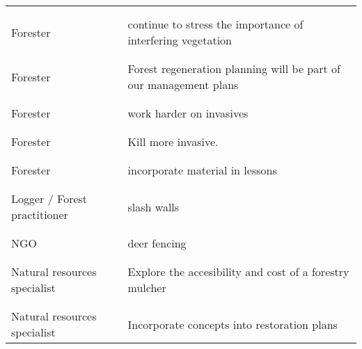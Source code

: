 \documentclass[
]{article}
\begin{document}
\begin{longtable}[t]{l>{\raggedright\arraybackslash}p{10cm}}
\midrule\\
\cellcolor{gray!10}{Forester} & \cellcolor{gray!10}{Invasive plants control}\\
\midrule
Forester & continue to stress the importance of interfering vegetation\\
\midrule\\
\addlinespace
\cellcolor{gray!10}{Forester} & \cellcolor{gray!10}{I am now retired, so probably no specific actions}\\
\midrule
Forester & Forest regeneration planning will be part of our management plans\\
\midrule\\
\cellcolor{gray!10}{Forester} & \cellcolor{gray!10}{I would like to try a Fecon mower.}\\
\midrule
Forester & work harder on invasives\\
\midrule\\
\cellcolor{gray!10}{Forester} & \cellcolor{gray!10}{Integrate what I learn from the webinar when dealing with private property.}\\
\midrule
\addlinespace
Forester & Kill more invasive.\\
\midrule\\
\cellcolor{gray!10}{Forester} & \cellcolor{gray!10}{Promote slash fences.}\\
\midrule
Forester & incorporate material in lessons\\
\midrule\\
\cellcolor{gray!10}{Forester} & \cellcolor{gray!10}{herbaceous and woody plant control with propane torch}\\
\midrule
Logger / Forest practitioner & slash walls\\
\midrule\\
\addlinespace
\cellcolor{gray!10}{Logger / Forest practitioner} & \cellcolor{gray!10}{Slash wall}\\
\midrule
NGO & deer fencing\\
\midrule\\
\cellcolor{gray!10}{Natural resources specialist} & \cellcolor{gray!10}{Some of techniques will help in my restoration projects}\\
\midrule
Natural resources specialist & Explore the accesibility and cost of a forestry mulcher\\
\midrule\\
\cellcolor{gray!10}{Natural resources specialist} & \cellcolor{gray!10}{N/A}\\
\midrule
\addlinespace
Natural resources specialist & Incorporate concepts into restoration plans\\

\end{longtable}
\end{document}

